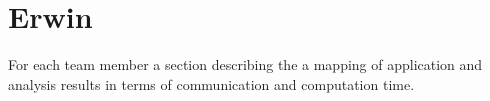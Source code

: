 \documentclass[final]{report}
\begin{document}
\section{Erwin}
For each team member a section describing the a mapping of application and analysis results in terms of communication and computation time.
\end{document}
